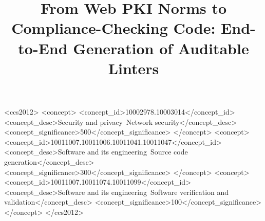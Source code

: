 \documentclass[10pt,sigconf,anonymous,nonacm]{acmart}
\title{From Web PKI Norms to Compliance-Checking Code: End-to-End Generation of Auditable Linters}
\begin{document}
\begin{abstract}

\end{abstract}

\begin{CCSXML}
<ccs2012>
   <concept>
      <concept_id>10002978.10003014</concept_id>
      <concept_desc>Security and privacy~Network security</concept_desc>
      <concept_significance>500</concept_significance>
   </concept>
   <concept>
      <concept_id>10011007.10011006.10011041.10011047</concept_id>
      <concept_desc>Software and its engineering~Source code generation</concept_desc>
      <concept_significance>300</concept_significance>
   </concept>
   <concept>
      <concept_id>10011007.10011074.10011099</concept_id>
      <concept_desc>Software and its engineering~Software verification and validation</concept_desc>
      <concept_significance>100</concept_significance>
   </concept>
</ccs2012>
\end{CCSXML}
\maketitle














\appendix


\end{document}

